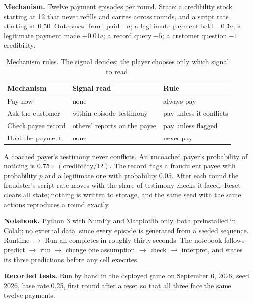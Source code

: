 \textbf{Mechanism.} Twelve payment episodes per round. State: a credibility stock starting at 12 that never refills and carries across rounds, and a script rate starting at 0.50. Outcomes: fraud paid $-a$; a legitimate payment held $-0.3a$; a legitimate payment made $+0.01a$; a record query $-5$; a customer question $-1$ credibility.

\begin{table}[h]
\caption{Mechanism rules. The signal decides; the player chooses only which signal to read.}
\label{tab:rules}
\footnotesize
\begin{tabularx}{\columnwidth}{@{}lYl@{}}
\toprule
Mechanism & Signal read & Rule \\
\midrule
Pay now & none & always pay \\
Ask the customer & within-episode testimony & pay unless it conflicts \\
Check payee record & others' reports on the payee & pay unless flagged \\
Hold the payment & none & never pay \\
\bottomrule
\end{tabularx}
\end{table}

A coached payer's testimony never conflicts. An uncoached payer's probability of noticing is $0.75\times(\text{credibility}/12)$. The record flags a fraudulent payee with probability $p$ and a legitimate one with probability $0.05$. After each round the fraudster's script rate moves with the share of testimony checks it faced. Reset clears all state; nothing is written to storage, and the same seed with the same actions reproduces a round exactly.

\textbf{Notebook.} Python 3 with NumPy and Matplotlib only, both preinstalled in Colab; no external data, since every episode is generated from a seeded sequence. Runtime $\rightarrow$ Run all completes in roughly thirty seconds. The notebook follows predict $\rightarrow$ run $\rightarrow$ change one assumption $\rightarrow$ check $\rightarrow$ interpret, and states its three predictions before any cell executes.

\textbf{Recorded tests.} Run by hand in the deployed game on September 6, 2026, seed 2026, base rate 0.25, first round after a reset so that all three face the same twelve payments.

